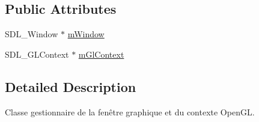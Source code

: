 \subsection*{Public Attributes}
\begin{DoxyCompactItemize}
\item 
S\+D\+L\+\_\+\+Window $\ast$ \hyperlink{struct_wrapper_s_d_l_1_1_window_manager_a38d24f995d5ed81c582edc825aeaf3c2}{m\+Window}
\item 
S\+D\+L\+\_\+\+G\+L\+Context $\ast$ \hyperlink{struct_wrapper_s_d_l_1_1_window_manager_a8257cbe95c6577a81fcfa83519f5e036}{m\+Gl\+Context}
\end{DoxyCompactItemize}


\subsection{Detailed Description}
Classe gestionnaire de la fenêtre graphique et du contexte Open\+G\+L. 


